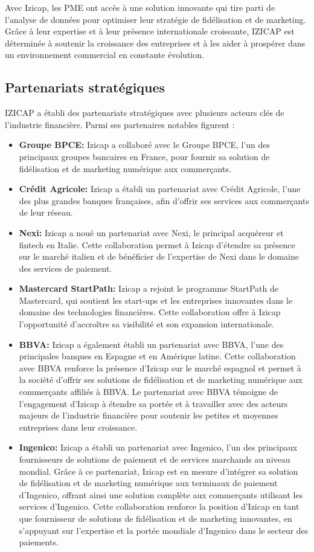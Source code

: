 Avec Izicap, les PME ont accès à une solution innovante qui tire parti de l'analyse de données pour optimiser leur stratégie de fidélisation et de marketing. Grâce à leur expertise et à leur présence internationale croissante, IZICAP est déterminée à soutenir la croissance des entreprises et à les aider à prospérer dans un environnement commercial en constante évolution.
\subsection{Partenariats stratégiques}
IZICAP a établi des partenariats stratégiques avec plusieurs acteurs clés de l'industrie financière. Parmi ses partenaires notables figurent :
\begin{itemize}
    \item \textbf{Groupe BPCE:} Izicap a collaboré avec le Groupe BPCE, l'un des principaux groupes bancaires en France, pour fournir sa solution de fidélisation et de marketing numérique aux commerçants.
    \item \textbf{Crédit Agricole:} Izicap a établi un partenariat avec Crédit Agricole, l'une des plus grandes banques françaises, afin d'offrir ses services aux commerçants de leur réseau.
    \item \textbf{Nexi:} Izicap a noué un partenariat avec Nexi, le principal acquéreur et fintech en Italie. Cette collaboration permet à Izicap d'étendre sa présence sur le marché italien et de bénéficier de l'expertise de Nexi dans le domaine des services de paiement.
    \item \textbf{Mastercard StartPath:} Izicap a rejoint le programme StartPath de Mastercard, qui soutient les start-ups et les entreprises innovantes dans le domaine des technologies financières. Cette collaboration offre à Izicap l'opportunité d'accroître sa visibilité et son expansion internationale.
    \item \textbf{BBVA:} Izicap a également établi un partenariat avec BBVA, l'une des principales banques en Espagne et en Amérique latine. Cette collaboration avec BBVA renforce la présence d'Izicap sur le marché espagnol et permet à la société d'offrir ses solutions de fidélisation et de marketing numérique aux commerçants affiliés à BBVA. Le partenariat avec BBVA témoigne de l'engagement d'Izicap à étendre sa portée et à travailler avec des acteurs majeurs de l'industrie financière pour soutenir les petites et moyennes entreprises dans leur croissance.
    \item \textbf{Ingenico:} Izicap a établi un partenariat avec Ingenico, l'un des principaux fournisseurs de solutions de paiement et de services marchands au niveau mondial. Grâce à ce partenariat, Izicap est en mesure d'intégrer sa solution de fidélisation et de marketing numérique aux terminaux de paiement d'Ingenico, offrant ainsi une solution complète aux commerçants utilisant les services d'Ingenico. Cette collaboration renforce la position d'Izicap en tant que fournisseur de solutions de fidélisation et de marketing innovantes, en s'appuyant sur l'expertise et la portée mondiale d'Ingenico dans le secteur des paiements.
\end{itemize}
